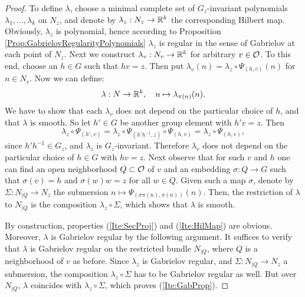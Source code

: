 \begin{proof}
To define $\lambda$, choose a minimal complete set of $G_z$-invariant polynomials
$\lambda_{1},\dots,\lambda_{k}$ on $N_z$, and denote by $\lambda_z : N_z \rightarrow \mathbb{R}^k$ 
the corresponding Hilbert map. 
Obviously, $\lambda_z$ is polynomial, hence according to 
Proposition \ref{Prop:GabrielovRegularityPolynomials}
$\lambda_z$ is regular in the sense of Gabrielov at each 
point of $N_z$.
Next we construct  $\lambda_v :N_v \rightarrow \mathbb{R}^k$ for arbitrary $v\in \mathcal{O}$. 
To this end, choose an $h\in G$ such that $hv =z$. Then put
$\lambda_v (n) = \lambda_z \circ \Psi_{(h,v)} (n)$ for $n\in N_v$.
Now we can define:
\[
 \lambda : N \rightarrow \mathbb{R}^k, \quad n \mapsto  \lambda_{\pi (n)} (n) .  
\]
We have to show that each $\lambda_v$ does not depend on the particular choice of $h$,
and that $\lambda$ is  smooth. So let $h'\in G$ be another group element with 
$h'v =z$. Then 
\[
 \lambda_z \circ \Psi_{(h',v)} = \lambda_z \circ \Psi_{(h'h^{-1},z)} \circ \Psi_{(h,v)} =
  \lambda_z \circ \Psi_{(h,v)} ,
\]
since $h'h^{-1}\in G_z$, and $\lambda_z$ is $G_z$-invariant. Therefore $\lambda_v$
does not depend on the particular choice of $h\in G$ with $hv=z$. 
Next observe that for such $v$ and $h$ one can find  an open neighborhood $Q\subset \mathcal{O}$ of $v$ and
an embedding $\sigma : Q \rightarrow G$ such that $\sigma (v) =h$ and $\sigma (w)w =z$ for all $w\in Q$.
Given such a map $\sigma$, denote by $\Sigma :N_{|Q} \rightarrow N_z$ the submersion  
$n \mapsto \Psi_{(\sigma \pi (n),\pi(n))} (n)$. Then, the restriction of $\lambda$ to 
$N_{|Q}$  is the composition $\lambda_z \circ \Sigma$, which shows that $\lambda$ is smooth.

By construction, properties  (\ref{Ite:SecProj}) and (\ref{Ite:HilMap}) are obvious. 
Moreover, $\lambda$ is Gabrielov regular by the following argument. It suffices to verify that 
$\lambda$ is Gabrielov regular on the restricted bundle $N_{|Q}$, where $Q$ is a neighborhood 
of $v$ as before. Since $\lambda_z$ is Gabrielov regular, and $\Sigma : N_{|Q} \rightarrow N_z$ 
a submersion, the composition $\lambda_z \circ \Sigma$ has to be Gabrielov regular as well. 
But over $N_{|Q}$, $\lambda$ coincides with $\lambda_z \circ \Sigma$, which proves 
(\ref{Ite:GabProp}).


\end{proof}
